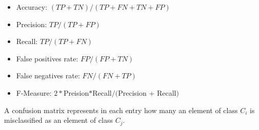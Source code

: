 \begin{itemize}
    \item Accuracy: $(TP + TN) / (TP + FN + TN + FP)$
    \item Precision: $TP / (TP + FP)$
    \item Recall: $TP / (TP + FN)$
    \item False positives rate: $FP / (FP + TN)$
    \item False negatives rate: $FN / (FN + TP)$
    \item F-Measure: $2*$Preision$*$Recall$/($Precision + Recall$)$
\end{itemize}

A confusion matrix represents in each entry how many an element of class $C_i$ is misclassified as an element of class $C_j$.
